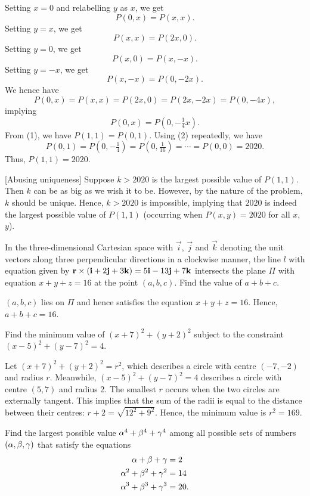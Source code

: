  Setting $x=0$ and relabelling $y$ as $x$, we get \[P(0, x) = P(x, x) \tag{1}.\] Setting $y = x$, we get \[P(x, x) = P(2x , 0).\] Setting $y = 0$, we get \[P(x, 0) = P(x, -x).\] Setting $y = -x$, we get \[P(x, -x) = P(0, -2x).\] We hence have \[P(0, x) = P(x, x) = P(2x, 0) = P(2x, -2x) = P(0, -4x),\] implying \[P(0, x) = P(0, -\tfrac14 x) \tag{2}.\] From (1), we have $P(1, 1) = P(0, 1)$. Using (2) repeatedly, we have \[P(0, 1) = P(0, -\tfrac14) = P(0, \tfrac1{16}) = \cdots = P(0, 0) = 2020.\] Thus, $P(1, 1) = 2020$.

[Abusing uniqueness] Suppose $k > 2020$ is the largest possible value of $P(1, 1)$. Then $k$ can be as big as we wish it to be. However, by the nature of the problem, $k$ should be unique. Hence, $k > 2020$ is impossible, implying that $2020$ is indeed the largest possible value of $P(1, 1)$ (occurring when $P(x, y) = 2020$ for all $x$, $y$).

\begin{question}[16]\label{A::2021-O-1-7}
    In the three-dimensional Cartesian space with $\vec i$, $\vec j$ and $\vec k$ denoting the unit vectors along three perpendicular directions in a clockwise manner, the line $l$ with equation given by $\mathbf{r} \times (\mathbf{i} + 2 \mathbf{j} + 3 \mathbf{k}) = 5\mathbf{i} - 13\mathbf{j} + 7\mathbf{k}$ intersects the plane $\Pi$ with equation $x + y + z = 16$ at the point $(a, b, c)$. Find the value of $a + b + c$.
\end{question}

$(a, b, c)$ lies on $\Pi$ and hence satisfies the equation $x + y + z = 16$. Hence, $a + b + c = 16$.

\begin{question}[169]\label{A::2021-O-1-8}
    Find the minimum value of $(x + 7)^2 + (y + 2)^2$ subject to the constraint $(x-5)^2 + (y-7)^2 = 4$.
\end{question}

Let $(x + 7)^2 + (y + 2)^2 = r^2$, which describes a circle with centre $(-7, -2)$ and radius $r$. Meanwhile, $(x-5)^2 + (y-7)^2 = 4$ describes a circle with centre $(5, 7)$ and radius 2. The smallest $r$ occurs when the two circles are externally tangent. This implies that the sum of the radii is equal to the distance between their centres: $r + 2 = \sqrt{12^2 + 9^2}$. Hence, the minimum value is $r^2 = 169$.

\begin{question}[98]\label{A::2021-O-1-9}
    Find the largest possible value $\alpha^4 + \beta^4 + \gamma^4$ among all possible sets of numbers $(\alpha, \beta, \gamma)$ that satisfy the equations
    \[\begin{aligned}
        \alpha + \beta + \gamma &= 2\\
        \alpha^2 + \beta^2 + \gamma^2 &= 14\\
        \alpha^3 + \beta^3 + \gamma^3 &= 20.
    \end{aligned}\]
\end{question}

